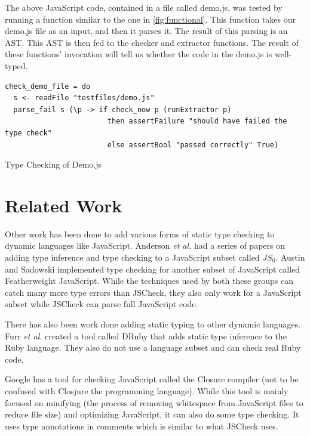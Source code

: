 \documentclass{article}
\begin{document}
The above JavaScript code, contained in a file called demo.js, was tested by running
a function similar to the one in \ref{fig:functional}. This function takes our demo.js 
file as an input, and then it parses it. The result of this parsing is an AST. This AST 
is then fed to the checker and extractor functions. The result of these functions' invocation 
will tell us whether the code in the demo.js is well-typed.


\begin{program}
\begin{verbatim}    
check_demo_file = do
  s <- readFile "testfiles/demo.js"
  parse_fail s (\p -> if check_now p (runExtractor p)
                        then assertFailure "should have failed the type check" 
                        else assertBool "passed correctly" True)
\end{verbatim}
\caption{Type Checking of Demo.js}
\label{fig:functional}
\end{program}
\pagebreak


\section{Related Work}
\label{sec:related}
Other work has been done to add various forms of static type checking to dynamic
languages like JavaScript. Anderson {\em et al.}
\cite{typeinferenceforjavascriptEcoop, typecheckingforjavascript} had a series of papers
on adding type inference and type checking to a JavaScript subset called $JS_0$. Austin
and Sadowski \cite{fwjsStruct} implemented type checking for another subset of JavaScript called 
Featherweight JavaScript. While the techniques used by both these groups can catch 
many more type errors than JSCheck, 
they also only work for a JavaScript subset while JSCheck can parse full JavaScript code.

There has also been work done adding static typing to other dynamic languages. Furr {\em et al.}
\cite{typecheckingruby} created a tool called DRuby that adds static type inference to
the Ruby language. They also do not use a language subset and can check real Ruby code.

Google has a tool for checking JavaScript called the Closure 
compiler \cite{closureCompiler} (not to be confused with Closjure the programming language).
While this tool is mainly focused on minifying (the process of removing whitespace from
JavaScript files to reduce file size)
and optimizing JavaScript, it can also do some type checking. It uses type
annotations in comments which is similar to what JSCheck uses.
\end{document}
